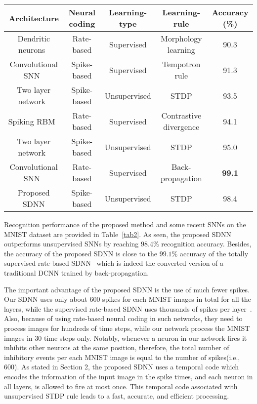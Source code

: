 \documentclass[preprint,5p,12pt,twocolumn]{article}
\begin{document}
 \begin{table*}[!ht]
 \centering
\caption{Recognition accuracies of the proposed SDNN and some other SNNs over the MNIST dataset.}
\label{tab2}{\begin{tabular}{|c|c|c|c|c|}
\hline
Architecture &Neural coding& Learning-type & Learning-rule & Accuracy (\%)\\ \hline
Dendritic neurons~\cite{hussain2014improved} & Rate-based& Supervised & Morphology learning & 90.3\\
\hline
Convolutional SNN~\cite{zhao2015feedforward} & Spike-based & Supervised & Tempotron rule & 91.3\\
\hline
Two layer network~\cite{querlioz2013immunity} & Spike-based &Unsupervised &  STDP & 93.5\\
\hline
Spiking RBM~\cite{o2015real}& Rate-based & Supervised & Contrastive divergence & 94.1\\
\hline
Two layer network~\cite{diehl2015unsupervised} & Spike-based & Unsupervised &  STDP &
95.0\\
\hline
Convolutional SNN~\cite{diehl2015fast} & Rate-based & Supervised & Back-propagation & \textbf{99.1}\\
\hline
Proposed SDNN & Spike-based & Unsupervised & STDP & 98.4\\
\hline
\end{tabular}}
\end{table*}

  Recognition performance of the proposed method and some recent SNNs on the MNIST dataset are provided in Table~\ref{tab2}. As seen, the proposed SDNN outperforms unsupervised SNNs by reaching $98.4\%$ recognition accuracy. Besides, the accuracy of the proposed SDNN is close to the $99.1\%$ accuracy of the totally supervised rate-based SDNN~\cite{diehl2015fast} which is indeed the converted version of a traditional DCNN trained by back-propagation.

The important advantage of the proposed SDNN is the use of much fewer spikes. Our SDNN  uses only about 600 spikes for each MNIST images in total for  all the layers, while the supervised rate-based SDNN uses thousands of spikes per layer~\cite{diehl2015fast}. Also, because of using rate-based neural coding in such networks, they need to process images for hundreds of time steps, while our network process the MNIST images in 30 time steps only. Notably, whenever a neuron in our network fires it inhibits other neurons at the same position, therefore, the total number of inhibitory events per each MNIST image is equal to the number of spikes(i.e., 600). As stated in Section 2, the proposed SDNN uses a temporal code which encodes the information of the input image in the spike times, and each neuron in all  layers, is allowed to fire at most once. This temporal code associated with unsupervised STDP rule leads to a fast, accurate, and efficient processing.
\end{document}
